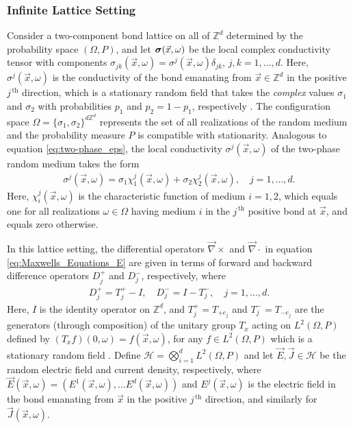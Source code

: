 \documentclass{cmslatex}
\newcommand\bsig{\mbox{\boldmath${\sigma}$}}
\begin{document}
\subsubsection{Infinite Lattice Setting}
\label{sec:Infinite_Lattice_Setting}
%
Consider a two-component bond lattice on all of $\mathbb{Z}^d$
determined by the probability space $(\Omega,P)$, and let
$\bsig(\vec{x},\omega)$ be the local complex conductivity tensor with
components $\sigma_{jk}(\vec{x},\omega)=\sigma^j(\vec{x},\omega)\delta_{jk}$, $j,k=1,\ldots,d$. Here,
$\sigma^j(\vec{x},\omega)$ is the conductivity of the bond emanating from 
$\vec{x}\in\mathbb{Z}^d$ in the positive $j^{\,\text{th}}$ direction, 
which is a stationary random field that takes the \emph{complex} values
$\sigma_1$ and $\sigma_2$ with probabilities $p_1$ and $p_2=1-p_1$,
respectively \cite{Golden:CMP-467,Bruno:JSP-365}. The configuration
space $\Omega=\{\sigma_1,\sigma_2\}^{d\mathbb{Z}^d}$ represents the set of all
realizations of the random medium and the 
probability measure $P$ is compatible with stationarity. Analogous to
equation \eqref{eq:two-phase_eps}, the local conductivity
$\sigma^j(\vec{x},\omega)$ of the two-phase random medium takes the form
\cite{Golden:CMP-467} 
%
\begin{align}\label{eq:two-phase_sigma}
  \sigma^j(\vec{x},\omega)=\sigma_1\chi_1^j(\vec{x},\omega)+\sigma_2\chi_2^j(\vec{x},\omega), \quad j=1,\ldots,d.
\end{align}
%
Here, $\chi_i^j(\vec{x},\omega)$ is the characteristic function of medium
$i=1,2$, which equals one for all realizations $\omega\in\Omega$ having medium $i$
in the $j^{\,\text{th}}$ positive bond at $\vec{x}$, and equals zero
otherwise.




In this lattice setting, the differential operators $\vec{\nabla}\times$ and
$\vec{\nabla}\cdot$ in equation \eqref{eq:Maxwells_Equations_E} are given 
\cite{Golden:CMP-467,Bruno:JSP-365} in terms of forward and backward
difference operators $D_j^+$ and $D_j^-$, respectively, where
%
\begin{align}\label{eq:Difference_Operators}
  D_j^+=T_j^+-I, \quad D_j^-=I-T_j^-, \quad j=1,\ldots,d.
\end{align}
%
Here, $I$ is the identity operator on $\mathbb{Z}^d$, and 
$T_j^+=T_{+e_j}$ and $T_j^-=T_{-e_j}$ are the generators (through 
composition) of the unitary group $T_x$ acting on $L^2(\Omega,P)$ defined
by $(T_xf)(0,\omega)=f(\vec{x},\omega)$, for any $f\in L^2(\Omega,P)$
which is a stationary random field
\cite{Golden:CMP-467}. Define $\mathscr{H}=\bigotimes_{i=1}^dL^2(\Omega,P)$ and let
$\vec{E},\vec{J}\in \mathscr{H}$ be  
the random electric field and current density,
respectively, where $\vec{E}(\vec{x},\omega)=(E^1(\vec{x},\omega),\ldots
E^d(\vec{x},\omega))$ and $E^j(\vec{x},\omega)$ is the electric field in the
bond emanating from $\vec{x}$ in the positive $j^{\,\text{th}}$
direction, and similarly for $\vec{J}(\vec{x},\omega)$. 
\end{document}
